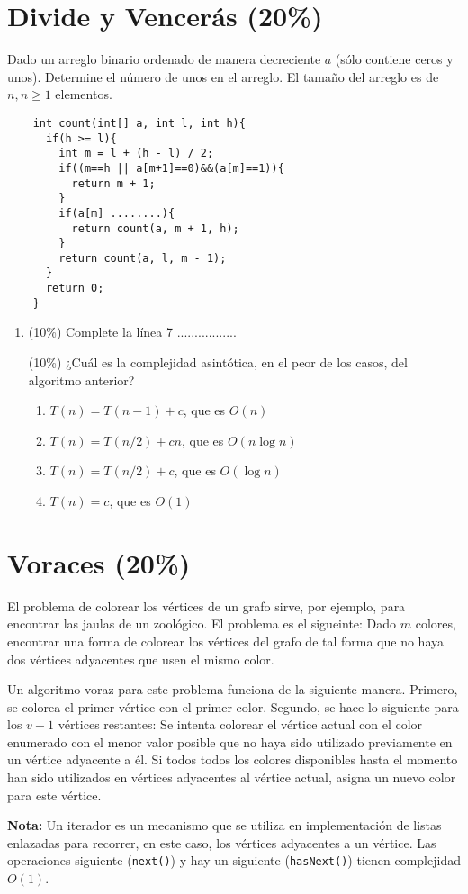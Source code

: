 \documentclass[10 pt]{article}
\begin{document}
\begin{multicols}{2}
	\section{Divide y Vencerás (20\%)}
	Dado un arreglo binario ordenado de manera decreciente $a$ (sólo contiene ceros y unos). Determine el número de unos en el arreglo. El tamaño del arreglo es de $n, n \geq 1$ elementos.
	{\footnotesize
	\begin{lstlisting}
	int count(int[] a, int l, int h){
	  if(h >= l){
	    int m = l + (h - l) / 2;
	    if((m==h || a[m+1]==0)&&(a[m]==1)){
	      return m + 1;
	    }
	    if(a[m] ........){
	      return count(a, m + 1, h);
	    }
	    return count(a, l, m - 1);
	  }
      return 0;
	}
	\end{lstlisting}
	}
	\begin{enumerate}[label=\alph*]
		\item (10\%) Complete la línea 7 .................
	
	(10\%) ¿Cuál es la complejidad asintótica, en el peor de los casos, del algoritmo anterior?
	\begin{enumerate}[label=\roman*]
		\item $T(n) = T(n-1) + c$, que es $O(n)$
		\item $T(n) = T(n/2) + cn$, que es $O(n \log n)$
		\item $T(n) = T(n/2) + c$, que es $O(\log n)$
		\item $T(n) = c$, que es $O(1)$
	\end{enumerate}
	\end{enumerate}


\section{Voraces (20\%)}
El problema de colorear los vértices de un grafo sirve, por ejemplo, para encontrar las jaulas de un zoológico. 
El problema es el sigueinte: Dado $m$ colores, encontrar una forma de colorear los vértices del grafo de tal
forma que no haya dos vértices adyacentes que usen el mismo color.

Un algoritmo voraz para este problema funciona de la siguiente manera. Primero, se colorea el primer vértice
con el primer color. Segundo, se hace lo siguiente para los $v-1$ vértices restantes: Se intenta colorear el vértice
actual con el color enumerado con el menor valor posible que no haya sido utilizado previamente en un vértice
adyacente a él. Si todos todos los colores disponibles hasta el momento han sido utilizados en vértices
adyacentes al vértice actual, asigna un nuevo color para este vértice.

\textbf{Nota: } Un iterador es un mecanismo que se utiliza en implementación de listas enlazadas para recorrer, en este caso, los vértices adyacentes a un vértice.
Las operaciones siguiente (\texttt{next()}) y hay un siguiente (\texttt{hasNext()}) tienen complejidad $O(1)$.

\end{multicols}
\end{document}
